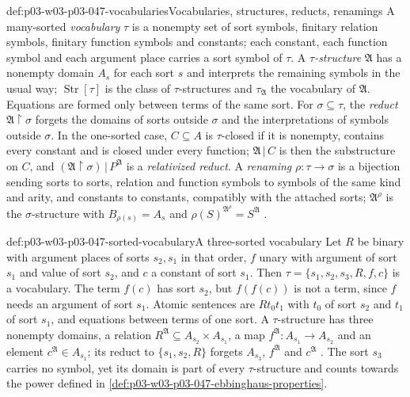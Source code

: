 \begin{hbconvention}{def:p03-w03-p03-047-vocabularies}{Vocabularies, structures, reducts, renamings}
A many-sorted \emph{vocabulary} \(\tau\) is a nonempty set of sort symbols,
finitary relation symbols, finitary function symbols and constants; each
constant, each function symbol and each argument place carries a sort symbol
of \(\tau\).  A \emph{\(\tau\)-structure} \(\mathfrak A\) has a nonempty
domain \(A_s\) for each sort \(s\) and interprets the remaining symbols in
the usual way; \(\operatorname{Str}[\tau]\) is the class of
\(\tau\)-structures and \(\tau_{\mathfrak A}\) the vocabulary of
\(\mathfrak A\).  Equations are formed only between terms of the same sort.
For \(\sigma\subseteq\tau\), the \emph{reduct} \(\mathfrak A\restriction\sigma\)
forgets the domains of sorts outside \(\sigma\) and the interpretations of
symbols outside \(\sigma\).  In the one-sorted case, \(C\subseteq A\) is
\(\tau\)-closed if it is nonempty, contains every constant and is closed
under every function; \(\mathfrak A\,|\,C\) is then the substructure on
\(C\), and \((\mathfrak A\restriction\sigma)\,|\,P^{\mathfrak A}\) is a
\emph{relativized reduct}.  A \emph{renaming} \(\rho:\tau\to\sigma\) is a
bijection sending sorts to sorts, relation and function symbols to symbols
of the same kind and arity, and constants to constants, compatibly with the
attached sorts; \(\mathfrak A^\rho\) is the \(\sigma\)-structure with
\(B_{\rho(s)}=A_s\) and \(\rho(S)^{\mathfrak A^\rho}=S^{\mathfrak A}\)
\cite[Ch.~II, \S1.1, pp.~26--27]{Ebbinghaus1985ExtendedLogics}.
\end{hbconvention}

\begin{hbexample}{def:p03-w03-p03-047-sorted-vocabulary}{A three-sorted vocabulary}
Let \(R\) be binary with argument places of sorts \(s_2,s_1\) in that order,
\(f\) unary with argument of sort \(s_1\) and value of sort \(s_2\), and \(c\)
a constant of sort \(s_1\).  Then \(\tau=\{s_1,s_2,s_3,R,f,c\}\) is a
vocabulary.  The term \(f(c)\) has sort \(s_2\), but \(f(f(c))\) is not a
term, since \(f\) needs an argument of sort \(s_1\).  Atomic sentences are
\(Rt_0t_1\) with \(t_0\) of sort \(s_2\) and \(t_1\) of sort \(s_1\), and
equations between terms of one sort.  A \(\tau\)-structure has three nonempty
domains, a relation \(R^{\mathfrak A}\subseteq A_{s_2}\times A_{s_1}\), a map
\(f^{\mathfrak A}:A_{s_1}\to A_{s_2}\) and an element
\(c^{\mathfrak A}\in A_{s_1}\); its reduct to \(\{s_1,s_2,R\}\) forgets
\(A_{s_3}\), \(f^{\mathfrak A}\) and \(c^{\mathfrak A}\)
\cite[Ch.~II, \S1.1, pp.~26--27]{Ebbinghaus1985ExtendedLogics}.  The sort
\(s_3\) carries no symbol, yet its domain is part of every \(\tau\)-structure
and counts towards the power defined in
\cref{def:p03-w03-p03-047-ebbinghaus-properties}.
\end{hbexample}

